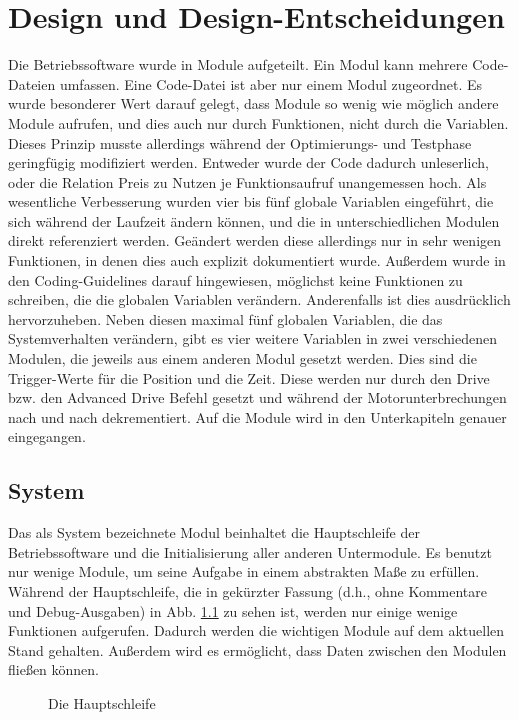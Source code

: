 \chapter{Design und Design-Entscheidungen}
Die Betriebssoftware wurde in Module aufgeteilt. Ein Modul kann mehrere Code-Dateien
umfassen. Eine Code-Datei ist aber nur einem Modul zugeordnet.
Es wurde besonderer Wert darauf gelegt, dass Module so wenig wie möglich andere
Module aufrufen, und dies auch nur durch Funktionen, nicht durch die Variablen.
Dieses Prinzip musste allerdings während der Optimierungs- und Testphase
geringfügig modifiziert werden. Entweder wurde der Code dadurch unleserlich, oder
die Relation Preis zu Nutzen je Funktionsaufruf unangemessen hoch.
Als wesentliche Verbesserung wurden vier bis fünf globale Variablen eingeführt, die
sich während der Laufzeit ändern können, und die in unterschiedlichen Modulen direkt
referenziert werden.
Geändert werden diese allerdings nur in sehr wenigen Funktionen, in denen dies
auch explizit dokumentiert wurde. Außerdem wurde in den Coding-Guidelines darauf hingewiesen,
möglichst keine Funktionen zu schreiben, die die globalen Variablen verändern.
Anderenfalls ist dies ausdrücklich hervorzuheben.
Neben diesen maximal fünf globalen Variablen, die das Systemverhalten verändern, gibt es vier
weitere Variablen in zwei verschiedenen Modulen, die jeweils aus einem anderen
Modul gesetzt werden. Dies sind die Trigger-Werte für die Position und
die Zeit. Diese werden nur durch den Drive bzw. den Advanced Drive Befehl
gesetzt und während der Motorunterbrechungen nach und nach dekrementiert.
Auf die Module wird in den Unterkapiteln genauer eingegangen.
\section{System}
Das als System bezeichnete Modul beinhaltet die Hauptschleife der Betriebssoftware
und die Initialisierung aller anderen Untermodule. Es benutzt nur wenige Module,
um seine Aufgabe in einem abstrakten Maße zu erfüllen. Während der Hauptschleife, die
in gekürzter Fassung (d.h., ohne Kommentare und Debug-Ausgaben) in Abb. \ref{main_loop} zu sehen ist,
werden nur einige wenige Funktionen aufgerufen. Dadurch werden die wichtigen Module auf dem
aktuellen Stand gehalten. Außerdem wird es ermöglicht, dass Daten zwischen den Modulen fließen können.
\begin{figure}[htb]
 \centering
 \caption{\label{main_loop}Die Hauptschleife}
\end{figure}
